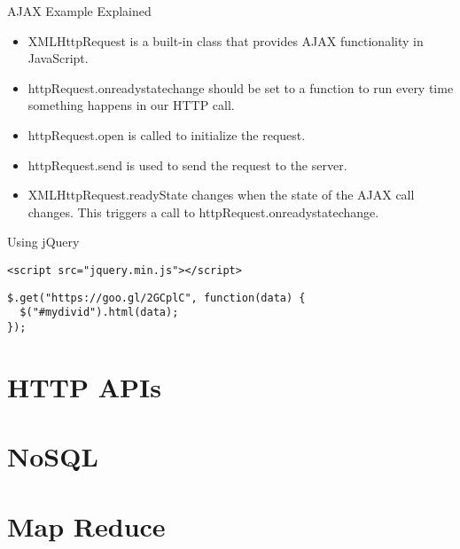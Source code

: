 \begin{frame}{AJAX Example Explained}
  \begin{itemize}
    \item XMLHttpRequest is a built-in class that provides AJAX functionality in JavaScript.
    \item httpRequest.onreadystatechange should be set to a function to run every time something happens in our HTTP call.
    \item httpRequest.open is called to initialize the request.
    \item httpRequest.send is used to send the request to the server.
    \item XMLHttpRequest.readyState changes when the state of the AJAX call changes. This triggers a call to httpRequest.onreadystatechange.
  \end{itemize}
\end{frame}

\begin{frame}[fragile]{Using jQuery}
  \begin{verbatim}
<script src="jquery.min.js"></script>
  \end{verbatim}
  \vspace{1cm}
  \begin{verbatim}
$.get("https://goo.gl/2GCplC", function(data) {
  $("#mydivid").html(data);
});
  \end{verbatim}
\end{frame}


\section{HTTP APIs}

\section{NoSQL}

\section{Map Reduce}